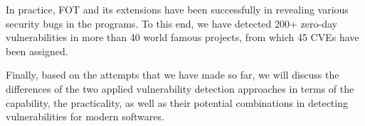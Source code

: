 In practice, FOT and its extensions have been successfully in revealing various security bugs in the programs. To this end, we have detected 200+ zero-day vulnerabilities in more than 40 world famous projects, from which 45 CVEs have been assigned.

Finally, based on the attempts that we have made so far, we will discuss the differences of the two applied vulnerability detection approaches in terms of the capability, the practicality, as well as their potential combinations in detecting vulnerabilities for modern softwares.






